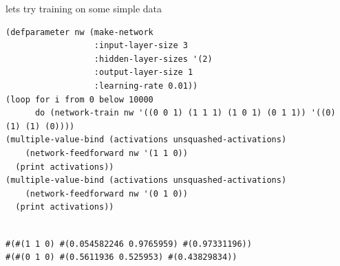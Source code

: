 \documentclass[a4paper,12pt]{article}
\begin{document}
lets try training on some simple data\\

\lstset{language=Lisp,label= ,caption= ,captionpos=b,numbers=none}
\begin{lstlisting}
(defparameter nw (make-network
                  :input-layer-size 3
                  :hidden-layer-sizes '(2)
                  :output-layer-size 1
                  :learning-rate 0.01))
(loop for i from 0 below 10000
      do (network-train nw '((0 0 1) (1 1 1) (1 0 1) (0 1 1)) '((0) (1) (1) (0))))
(multiple-value-bind (activations unsquashed-activations)
    (network-feedforward nw '(1 1 0))
  (print activations))
(multiple-value-bind (activations unsquashed-activations)
    (network-feedforward nw '(0 1 0))
  (print activations))
\end{lstlisting}

\begin{verbatim}

#(#(1 1 0) #(0.054582246 0.9765959) #(0.97331196)) 
#(#(0 1 0) #(0.5611936 0.525953) #(0.43829834)) 
\end{verbatim}
\end{document}
